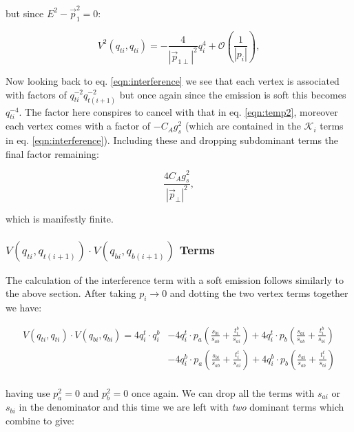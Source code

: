 			but since $E^2-\vec{p}_1^2=0$:

			\begin{equation}
				V^2(q_{ti}, q_{ti}) = - \frac{4}{|\vec{p}_{1\perp}|^2}q^4_{i} + \mathcal{O}\left(\frac{1}{|p_i|}\right),
				\label{eqn:temp2}
			\end{equation}

			Now looking back to eq. \eqref{eqn:interference} we see that each vertex is associated with factors of
			$q^{-2}_{ti}q^{-2}_{t(i+1)}$ but once again since the emission is soft this becomes $q^{-4}_{ti}$.
			The factor here conspires to cancel with that in eq. \eqref{eqn:temp2}, moreover each vertex comes with a
			factor of $-C_Ag^2_s$ (which are contained in the $\mathcal{K}_i$ terms in eq. \eqref{eqn:interference}).
			Including these and dropping subdominant terms the final factor remaining:

			\begin{equation}
				\frac{4C_Ag_s^2}{|\vec{p}_\perp|^2},
				\label{eqn:finalsoft}
			\end{equation}

			which is manifestly finite.

		\subsubsection{$V(q_{ti}, q_{t(i+1)})\cdot V(q_{bi}, q_{b(i+1)})$ Terms}
			\label{sub:subsection_name}

			The calculation of the interference term with a soft emission follows similarly to the above section.
			After taking $p_i\rightarrow0$ and dotting the two vertex terms together we have:

			\begin{equation}
			\begin{split}
				V(q_{ti}, q_{ti})\cdot V(q_{bi}, q_{bi}) = 4q_i^t\cdot q_i^b &- 4q_i^t\cdot p_a\left(\frac{s_{bi}}{s_{ab}} +
					\frac{t_i^b}{s_{ai}}\right) + 4q_i^t\cdot p_b\left(\frac{s_{ai}}{s_{ab}} + \frac{t_i^b}{s_{bi}}\right)\\
					&- 4q_i^b\cdot p_a\left(\frac{s_{bi}}{s_{ab}} + \frac{t_i^t}{s_{ai}}\right) +
					4q_i^b\cdot p_b\left(\frac{s_{ai}}{s_{ab}} +
					\frac{t_i^t}{s_{bi}}\right)\\
			\end{split}
			\end{equation}

			having use $p_a^2=0$ and $p_b^2=0$ once again.  We can drop all the terms with $s_{ai}$ or
			$s_{bi}$ in the denominator and this time we are left with \emph{two} dominant terms which
			combine to give:

